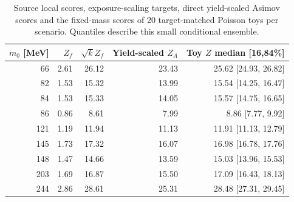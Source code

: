 \begin{table}[htbp]\centering\small
\begin{tabular}{rrrrr}\toprule
$m_0$ [MeV] & $Z_f$ & $\sqrt{k}Z_f$ & Yield-scaled $Z_A$ & Toy $Z$ median [16,84\%]\\\midrule
66 & 2.61 & 26.12 & 23.43 & 25.62 [24.93, 26.82] \\
82 & 1.53 & 15.32 & 13.99 & 15.54 [14.25, 16.47] \\
84 & 1.53 & 15.33 & 14.05 & 15.57 [14.75, 16.65] \\
86 & 0.86 & 8.61 & 7.99 & 8.86 [7.77, 9.92] \\
121 & 1.19 & 11.94 & 11.13 & 11.91 [11.13, 12.79] \\
145 & 1.73 & 17.32 & 16.07 & 16.98 [16.78, 17.76] \\
148 & 1.47 & 14.66 & 13.59 & 15.03 [13.96, 15.53] \\
203 & 1.69 & 16.87 & 15.50 & 17.09 [16.43, 18.13] \\
244 & 2.86 & 28.61 & 25.31 & 28.48 [27.31, 29.45] \\
\bottomrule\end{tabular}
\caption{Source local scores, exposure-scaling targets, direct yield-scaled
Asimov scores and the fixed-mass scores of 20 target-matched Poisson toys per
scenario. Quantiles describe this small conditional ensemble.}
\label{tab:v505-one}\end{table}